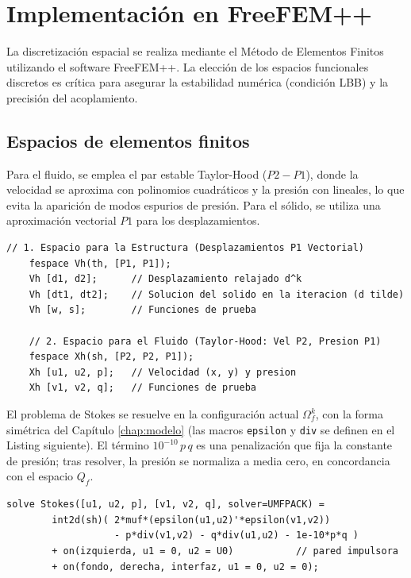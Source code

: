 \documentclass[12pt, letterpaper]{report}
\theoremstyle{definition}
\begin{document}
\section{Implementación en FreeFEM++}

La discretización espacial se realiza mediante el Método de Elementos Finitos utilizando el software FreeFEM++. La elección de los espacios funcionales discretos es crítica para asegurar la estabilidad numérica (condición LBB) y la precisión del acoplamiento.

\subsection{Espacios de elementos finitos}

Para el fluido, se emplea el par estable Taylor-Hood ($P2-P1$), donde la velocidad se aproxima con polinomios cuadráticos y la presión con lineales, lo que evita la aparición de modos espurios de presión. Para el sólido, se utiliza una aproximación vectorial $P1$ para los desplazamientos.

\begin{lstlisting}[caption={Definición de espacios funcionales y variables en FreeFEM++}]
    // 1. Espacio para la Estructura (Desplazamientos P1 Vectorial)
    fespace Vh(th, [P1, P1]);
    Vh [d1, d2];      // Desplazamiento relajado d^k
    Vh [dt1, dt2];    // Solucion del solido en la iteracion (d tilde)
    Vh [w, s];        // Funciones de prueba

    // 2. Espacio para el Fluido (Taylor-Hood: Vel P2, Presion P1)
    fespace Xh(sh, [P2, P2, P1]);
    Xh [u1, u2, p];   // Velocidad (x, y) y presion
    Xh [v1, v2, q];   // Funciones de prueba
\end{lstlisting}

El problema de Stokes se resuelve en la configuración actual $\Omega_f^k$, con la forma simétrica del Capítulo \ref{chap:modelo} (las macros \texttt{epsilon} y \texttt{div} se definen en el Listing siguiente). El término $10^{-10}\,p\,q$ es una penalización que fija la constante de presión; tras resolver, la presión se normaliza a media cero, en concordancia con el espacio $Q_f$.

\begin{lstlisting}[caption={Problema de Stokes en la configuración actual}]
    solve Stokes([u1, u2, p], [v1, v2, q], solver=UMFPACK) =
        int2d(sh)( 2*muf*(epsilon(u1,u2)'*epsilon(v1,v2))
                   - p*div(v1,v2) - q*div(u1,u2) - 1e-10*p*q )
        + on(izquierda, u1 = 0, u2 = U0)           // pared impulsora
        + on(fondo, derecha, interfaz, u1 = 0, u2 = 0);
\end{lstlisting}
\end{document}
